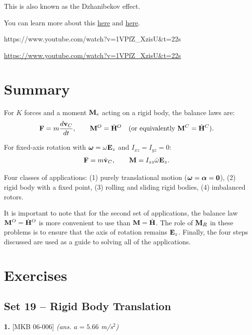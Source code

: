 \documentclass[
  letterpaper,
  DIV=11,
  numbers=noendperiod]{scrreprt}
\newcommand{\bomega}{\boldsymbol{\omega}}
\newcommand{\balpha}{\boldsymbol{\alpha}}
\begin{document}
This is also known as the Dzhanibekov effect.

You can learn more about this
\href{https://rotations.berkeley.edu/a-tumbling-t-handle-in-space/}{here}
and
\href{https://rotations.berkeley.edu/a-book-tossed-in-the-air/}{here}.

https://www.youtube.com/watch?v=1VPfZ\_XzisU\&t=22s

\url{https://www.youtube.com/watch?v=1VPfZ_XzisU&t=22s}

\section{Summary}\label{summary-12}

For \(K\) forces and a moment \({\bf M}_e\) acting on a rigid body, the
balance laws are: \begin{align}
    {\bf F} = m\frac{d{\bf v}_C}{dt}, \qquad {\bf M}^O = \dot{\bf H}^O \quad (\text{or equivalently } {\bf M}^C = \dot{\bf H}^C).
\end{align}

For fixed-axis rotation with \(\bomega = \omega{\bf E}_z\) and
\(I_{xz}=I_{yz}=0\): \begin{align}
    {\bf F} = m\dot{\bf v}_C, \qquad {\bf M} = I_{zz}\dot{\omega}{\bf E}_z.
\end{align}

Four classes of applications: (1) purely translational motion
(\(\bomega=\balpha={\bf 0}\)), (2) rigid body with a fixed point, (3)
rolling and sliding rigid bodies, (4) imbalanced rotors.

It is important to note that for the second set of applications, the
balance law \({\bf M}^O=\dot{\bf H}^O\) is more convenient to use than
\({\bf M}=\dot{\bf H}\). The role of \({\bf M}_R\) in these problems is
to ensure that the axis of rotation remains \({\bf E}_z\). Finally, the
four steps discussed are used as a guide to solving all of the
applications.

\section{Exercises}\label{exercises-15}

\subsection{Set 19 -- Rigid Body
Translation}\label{set-19-rigid-body-translation}

\textbf{1.} {[}MKB 06-006{]} \emph{(ans. \(a=5.66\) m/s\(^2\))}
\end{document}
